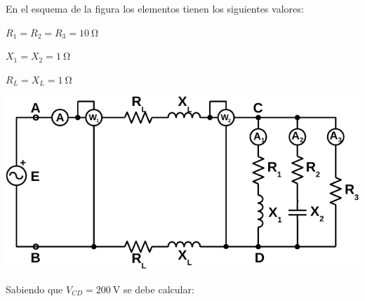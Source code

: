 \documentclass[12pt]{article}
\begin{document}

En el esquema de la figura los elementos tienen los siguientes valores:

$R_1 = R_2 = R_3 = \SI{10}{\ohm}$

$X_1 = X_2 = \SI{1}{\ohm}$%

$R_L = X_L = \SI{1}{\ohm}$

\begin{center}
  \includegraphics{figs/circuitoA.pdf}
\end{center}

Sabiendo que $V_{CD} = \SI{200}{\volt}$ se debe calcular:
\end{document}

